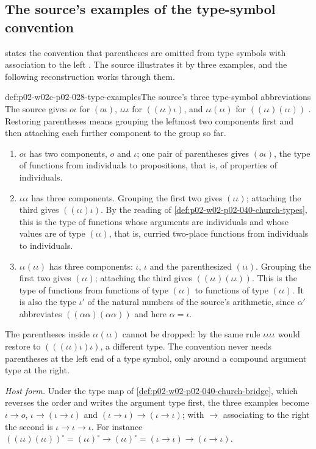 \subsection{The source's examples of the type-symbol convention}

 states the convention that
parentheses are omitted from type symbols with association to the left
\cite[\S1, p.~56]{Church1940}.  The source illustrates it by three examples,
and the following reconstruction works through them.

\begin{hbexample}{def:p02-w02c-p02-028-type-examples}{The source's three type-symbol abbreviations}
The source gives \(o\iota\) for \((o\iota)\), \(\iota\iota\iota\) for
\(((\iota\iota)\iota)\), and \(\iota\iota(\iota\iota)\) for
\(((\iota\iota)(\iota\iota))\) \cite[\S1, p.~56]{Church1940}.  Restoring
parentheses means grouping the leftmost two components first and then
attaching each further component to the group so far.
\begin{enumerate}
 \item \(o\iota\) has two components, \(o\) and \(\iota\); one pair of
   parentheses gives \((o\iota)\), the type of functions from individuals to
   propositions, that is, of properties of individuals.
 \item \(\iota\iota\iota\) has three components.  Grouping the first two
   gives \((\iota\iota)\); attaching the third gives
   \(((\iota\iota)\iota)\).  By the reading of
   \cref{def:p02-w02-p02-040-church-types}, this is the type of functions
   whose arguments are individuals and whose values are of type
   \((\iota\iota)\), that is, curried two-place functions from individuals
   to individuals.
 \item \(\iota\iota(\iota\iota)\) has three components: \(\iota\),
   \(\iota\) and the parenthesized \((\iota\iota)\).  Grouping the first two
   gives \((\iota\iota)\); attaching the third gives
   \(((\iota\iota)(\iota\iota))\).  This is the type of functions from
   functions of type \((\iota\iota)\) to functions of type \((\iota\iota)\).
   It is also the type \(\iota'\) of the natural numbers of the source's
   arithmetic, since \(\alpha'\) abbreviates \(((\alpha\alpha)(\alpha\alpha))\)
   and here \(\alpha=\iota\).
\end{enumerate}
The parentheses inside \(\iota\iota(\iota\iota)\) cannot be dropped: by the
same rule \(\iota\iota\iota\iota\) would restore to
\((((\iota\iota)\iota)\iota)\), a different type.  The convention never
needs parentheses at the left end of a type symbol, only around a compound
argument type at the right.

\emph{Host form.}  Under the type map of
\cref{def:p02-w02-p02-040-church-bridge}, which reverses the order and
writes the argument type first, the three examples become
\(\iota\to o\), \(\iota\to(\iota\to\iota)\) and
\((\iota\to\iota)\to(\iota\to\iota)\); with \(\to\) associating to the right
the second is \(\iota\to\iota\to\iota\).  For instance
\(((\iota\iota)(\iota\iota))^\circ=(\iota\iota)^\circ\to(\iota\iota)^\circ
=(\iota\to\iota)\to(\iota\to\iota)\).
\end{hbexample}

